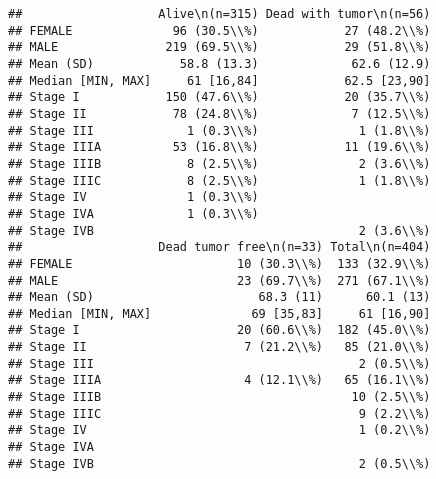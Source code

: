 \documentclass[
]{article}
\begin{document}
\begin{verbatim}
##                   Alive\n(n=315) Dead with tumor\n(n=56)
## FEMALE              96 (30.5\\%)            27 (48.2\\%)
## MALE               219 (69.5\\%)            29 (51.8\\%)
## Mean (SD)            58.8 (13.3)             62.6 (12.9)
## Median [MIN, MAX]     61 [16,84]            62.5 [23,90]
## Stage I            150 (47.6\\%)            20 (35.7\\%)
## Stage II            78 (24.8\\%)             7 (12.5\\%)
## Stage III             1 (0.3\\%)              1 (1.8\\%)
## Stage IIIA          53 (16.8\\%)            11 (19.6\\%)
## Stage IIIB            8 (2.5\\%)              2 (3.6\\%)
## Stage IIIC            8 (2.5\\%)              1 (1.8\\%)
## Stage IV              1 (0.3\\%)                        
## Stage IVA             1 (0.3\\%)                        
## Stage IVB                                     2 (3.6\\%)
##                   Dead tumor free\n(n=33) Total\n(n=404)
## FEMALE                       10 (30.3\\%)  133 (32.9\\%)
## MALE                         23 (69.7\\%)  271 (67.1\\%)
## Mean (SD)                       68.3 (11)      60.1 (13)
## Median [MIN, MAX]              69 [35,83]     61 [16,90]
## Stage I                      20 (60.6\\%)  182 (45.0\\%)
## Stage II                      7 (21.2\\%)   85 (21.0\\%)
## Stage III                                     2 (0.5\\%)
## Stage IIIA                    4 (12.1\\%)   65 (16.1\\%)
## Stage IIIB                                   10 (2.5\\%)
## Stage IIIC                                    9 (2.2\\%)
## Stage IV                                      1 (0.2\\%)
## Stage IVA                                               
## Stage IVB                                     2 (0.5\\%)
\end{verbatim}
\end{document}
